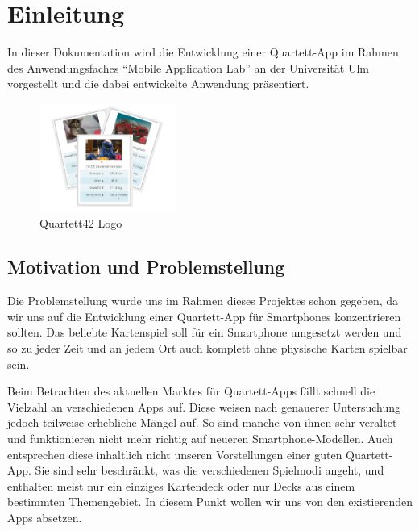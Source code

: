 \chapter{Einleitung}
\label{cha:einleitung}

In dieser Dokumentation wird die Entwicklung einer Quartett-App im Rahmen des Anwendungsfaches ``Mobile Application Lab'' an der Universität Ulm vorgestellt und die dabei entwickelte Anwendung präsentiert.\\

\begin{figure}[htp]
	\centering
  	\includegraphics[width=0.4\textwidth]{img/quartett42_logo.png}
	\caption{Quartett42 Logo}
	\label{figure:quartett42logo}
\end{figure}

\section{Motivation und Problemstellung}
\label{sec:einleitung:problemstellung}

Die Problemstellung wurde uns im Rahmen dieses Projektes schon gegeben, da wir uns auf die Entwicklung einer Quartett-App für Smartphones konzentrieren sollten. Das beliebte Kartenspiel soll für ein Smartphone umgesetzt werden und so zu jeder Zeit und an jedem Ort auch komplett ohne physische Karten spielbar sein.

Beim Betrachten des aktuellen Marktes für Quartett-Apps fällt schnell die Vielzahl an verschiedenen Apps auf. Diese weisen nach genauerer Untersuchung jedoch teilweise erhebliche Mängel auf. So sind manche von ihnen sehr veraltet und funktionieren nicht mehr richtig auf neueren Smartphone-Modellen. Auch entsprechen diese inhaltlich nicht unseren Vorstellungen einer guten Quartett-App. Sie sind sehr beschränkt, was die verschiedenen Spielmodi angeht, und enthalten meist nur ein einziges Kartendeck oder nur Decks aus einem bestimmten Themengebiet. In diesem Punkt wollen wir uns von den existierenden Apps absetzen.

